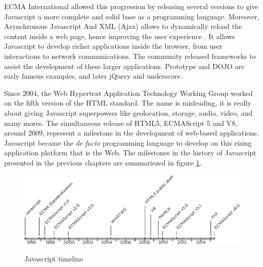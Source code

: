 ECMA International allowed this progression by releasing several versions to give Javascript a more complete and solid base as a programming language.
Moreover, %
Asynchronous Javascript And XML (Ajax) allows to dynamically reload the content inside a web page, hence improving the user experience \cite{Garrett2005}.
It allows Javascript to develop richer applications inside the browser, from user interactions to network communications.
The community released frameworks to assist the development of these larger applications.
Prototype and DOJO are early famous examples, and later jQuery and underscore.


Since 2004, the Web Hypertext Application Technology Working Group worked on the fifth version of the HTML standard.
The name is misleading, it is really about giving Javascript superpowers like geolocation, storage, audio, video, and many mores.
The simultaneous release of HTML5, ECMAScript 5 and V8, around 2009, represent a milestone in the development of web-based applications.
Javascript became the \textit{de facto} programming language to develop on this rising application platform that is the Web.
The milestones in the history of Javascript presented in the previous chapters are summariezed in figure \ref{fig:js-timeline}.

\begin{figure}
  \centering
  \includegraphics[width=\linewidth]{../resources/javascript-timeline.pdf}
  \label{fig:js-timeline}
  \caption{Javascript timeline}
\end{figure}


